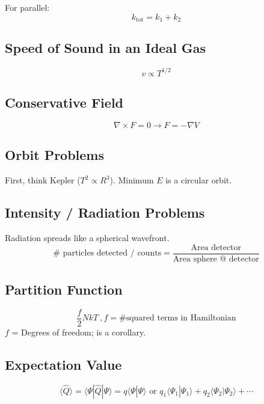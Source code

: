 \documentclass[10pt,a4paper]{article}
\begin{document}
For parallel: 
\begin{equation}
    k_{\textrm{tot}} = k_1 + k_2
\end{equation}

\subsection{Speed of Sound in an Ideal Gas}
\begin{equation}
 v \propto T^{1/2} 
\end{equation}

\subsection{Conservative Field}
\begin{equation}
 \nabla \times F = 0 \rightarrow F = -\nabla V
\end{equation}

\subsection{Orbit Problems}
First, think Kepler ($T^2 \propto R^3$). Minimum $E$ is a circular orbit.

\subsection{Intensity / Radiation Problems}
Radiation spreads like a spherical wavefront. 
\begin{equation}
 \# \textrm{ particles detected / counts} = \frac{\textrm{Area detector}}{\textrm{Area sphere @ detector}}
\end{equation}

\subsection{Partition Function}
\begin{equation}
 \frac{f}{2}NkT~,f = \textrm{\# squared terms in Hamiltonian}
\end{equation}
$f$ = Degrees of freedom; is a corollary.

\subsection{Expectation Value}
\begin{equation}
  \langle \hat{Q} \rangle = \langle \Psi | \hat{Q} | \Psi \rangle = q \langle \Psi | \Psi \rangle \textrm{ or } q_1 \langle \Psi_1 | \Psi_1 \rangle + q_2 \langle \Psi_2 | \Psi_2 \rangle + \cdots
\end{equation}
\end{document}
